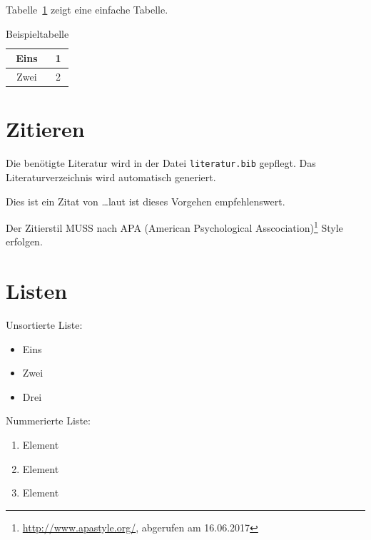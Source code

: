 \bigskip

\noindent
Tabelle~\ref{tab:beispieltabelle} zeigt eine einfache Tabelle.

\begin{table}[hbtp]
  \begin{center}
    \begin{tabular}{|c|c|}
      \hline 
      \rule[-1ex]{0pt}{2.5ex} Eins & 1 \\ 
      \hline 
      \rule[-1ex]{0pt}{2.5ex} Zwei & 2 \\ 
      \hline
    \end{tabular}
  \end{center}
  \caption{Beispieltabelle}
  \label{tab:beispieltabelle}
\end{table}

\section{Zitieren}

Die benötigte Literatur wird in der Datei \texttt{literatur.bib} gepflegt. Das Literaturverzeichnis wird automatisch generiert.

Dies ist ein Zitat von \citep*{Eckert2014} \dots laut \cite[Seite~42]{Eckert2014} ist dieses Vorgehen empfehlenswert.

\noindent
Der Zitierstil MUSS nach APA (American Psychological Asscociation)\footnote{\url{http://www.apastyle.org/}, abgerufen am 16.06.2017}
Style erfolgen.

\section{Listen}

Unsortierte Liste:

\begin{itemize}
 \item Eins
 \item Zwei
 \item Drei
\end{itemize}

\bigskip

\noindent
Nummerierte Liste:

\begin{enumerate}
 \item Element
 \item Element
 \item Element
\end{enumerate}

\indent